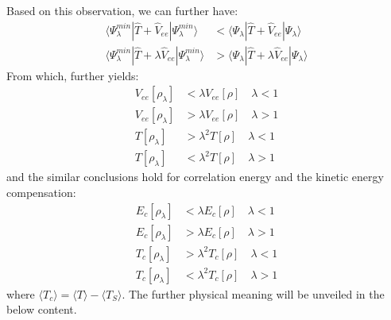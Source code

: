 Based on this observation, we can further have:
\begin{equation}
  \label{Uniform_coord_scaling_eq:11}
  \begin{split}
    \langle\Psi^{min}_{\lambda}|\hat{T} +
    \hat{V}_{ee}|\Psi^{min}_{\lambda}\rangle
&<     \langle\Psi_{\lambda}|\hat{T} +
    \hat{V}_{ee}|\Psi_{\lambda}\rangle \\
    \langle\Psi^{min}_{\lambda}|\hat{T} + \lambda
    \hat{V}_{ee}|\Psi^{min}_{\lambda}\rangle
&>     \langle\Psi_{\lambda}|\hat{T} + \lambda
    \hat{V}_{ee}|\Psi_{\lambda}\rangle
  \end{split}
\end{equation}
From which, further yields:
\begin{equation}
 \label{Uniform_coord_scaling_eq:12}
\begin{split}
V_{ee}[\rho_{\lambda}] &< \lambda V_{ee}[\rho] \quad \lambda < 1 \\
V_{ee}[\rho_{\lambda}] &> \lambda V_{ee}[\rho] \quad \lambda > 1 \\
T[\rho_{\lambda}] &> \lambda^{2} T[\rho] \quad \lambda < 1 \\
T[\rho_{\lambda}] &< \lambda^{2} T[\rho] \quad \lambda > 1 
\end{split}
\end{equation}
and the similar conclusions hold for correlation energy and the kinetic energy
compensation\cite{PhysRevA.32.2010}:  
\begin{equation}
 \label{Uniform_coord_scaling_eq:13}
\begin{split}
E_{c}[\rho_{\lambda}] &< \lambda E_{c}[\rho] \quad \lambda < 1 \\
E_{c}[\rho_{\lambda}] &> \lambda E_{c}[\rho] \quad \lambda > 1 \\
T_{c}[\rho_{\lambda}] &> \lambda^{2} T_{c}[\rho] \quad \lambda < 1 \\
T_{c}[\rho_{\lambda}] &< \lambda^{2} T_{c}[\rho] \quad \lambda > 1 
\end{split}
\end{equation}
where $\langle T_{c}\rangle = \langle T\rangle - \langle T_{S}\rangle$. The
further physical meaning will be unveiled in the below content. 

